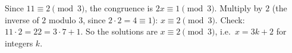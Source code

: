 Since $11\equiv2\pmod3$, the congruence is $2x\equiv1\pmod3$. Multiply by $2$ (the inverse of $2$ modulo $3$, since $2\cdot2=4\equiv1$): $x\equiv2\pmod3$. Check: $11\cdot2=22=3\cdot7+1$. So the solutions are $\boxed{x\equiv2\pmod 3}$, i.e.\ $x=3k+2$ for integers $k$.
